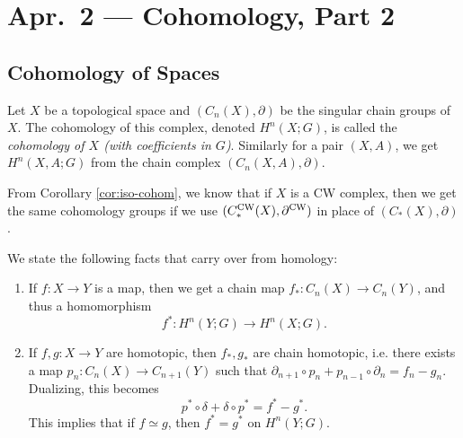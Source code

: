 \chapter{Apr.~2 --- Cohomology, Part 2}

\section{Cohomology of Spaces}

\begin{definition}
  Let $X$ be a topological space and
  $(C_n(X), \partial)$ be the singular chain groups
  of $X$. The cohomology of this complex, denoted
  $H^n(X; G)$, is
  called the \emph{cohomology of $X$ (with coefficients in $G$)}.
  Similarly for a pair $(X, A)$, we get $H^n(X, A; G)$
  from the chain complex $(C_n(X, A), \partial)$.
\end{definition}

\begin{remark}
  From Corollary \ref{cor:iso-cohom}, we know that
  if $X$ is a CW complex, then we get the same
  cohomology groups if we use
  $(C_*^{\mathrm{CW}}(X), \partial^{\mathrm{CW}})$ in place of
  $(C_*(X), \partial)$.
\end{remark}

\begin{remark}
  We state the following facts that carry over from
  homology:
  \begin{enumerate}
    \item If $f : X \to Y$ is a map, then
      we get a chain map $f_* : C_n(X) \to C_n(Y)$,
      and thus a homomorphism
      \[
        f^* : H^n(Y; G) \to H^n(X; G).
      \]
    \item If $f, g : X \to Y$ are homotopic, then
      $f_*, g_*$ are chain homotopic, i.e. there
      exists a map $p_n : C_n(X) \to C_{n + 1}(Y)$
      such that $\partial_{n + 1} \circ p_n + p_{n - 1} \circ \partial_n = f_n - g_n$.
      Dualizing, this becomes
      \[p^* \circ \delta + \delta \circ p^* = f^* - g^*.\]
      This implies that if $f \simeq g$, then
      $f^* = g^*$ on $H^n(Y; G)$.
  \end{enumerate}
\end{remark}

